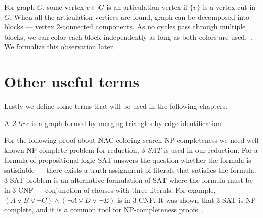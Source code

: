 For graph \( G \), some vertex \( v \in G \) is an articulation vertex if
\( \{v\} \) is a vertex cut in \( G \).
When all the articulation vertices are found,
graph can be decomposed into blocks
--- vertex \( 2 \)-connected components.
As no cycles pass through multiple blocks, we can color each block
independently as long as both colors are used.~\cite{my_paper}.
We formalize this observation later.

\section{Other useful terms}

Lastly we define some terms that will be used in the following chapters.
%
\begin{definition}%
	\label{def:2-tree}
	A \emph{2-tree} is a graph formed by merging triangles by edge identification.
\end{definition}

For the following proof about NAC-coloring search NP-completeness we need
well known NP-complete problem for reduction, \emph{3-SAT} is used in our reduction.
For a formula of propositional logic SAT answers the question
whether the formula is satisfiable ---
there exists a truth assignment of literals that satisfies the formula.
3-SAT problem is an alternative formulation of SAT
where the formula must be in 3-CNF --- conjunction of clauses with three literals.
For example, \( (A \lor B \lor \lnot C) \land (\lnot A \lor D \lor \lnot E) \)
is in 3-CNF\@.
It was shown that 3-SAT is NP-complete,
and it is a common tool for NP-completeness proofs~\cite{3-sat}.

